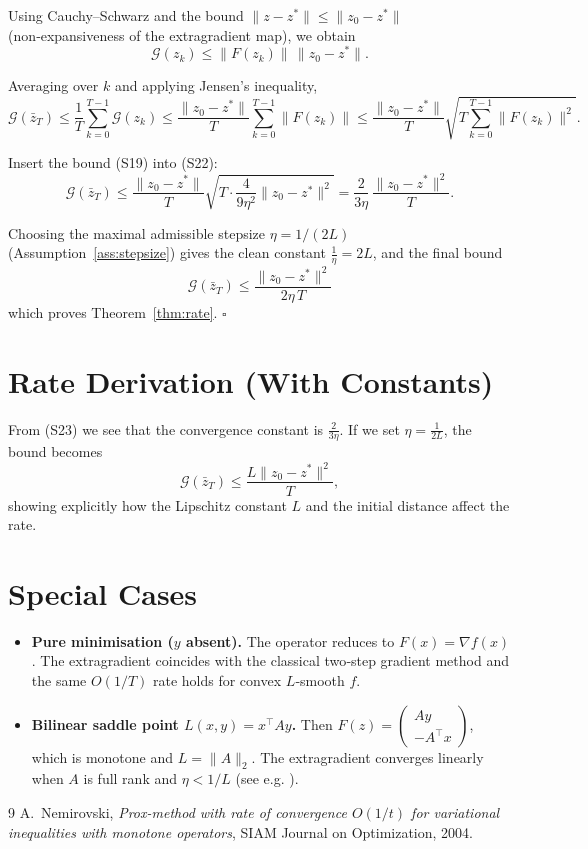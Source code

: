 \documentclass{article}
\begin{document}
Using Cauchy–Schwarz and the bound $\|z-z^{*}\|\le\|z_{0}-z^{*}\|$ (non‑expansiveness of the extragradient map), we obtain
\[
\mathcal G(z_{k})\le \|F(z_{k})\|\,\|z_{0}-z^{*}\|.
\tag{S21}
\]

Averaging over $k$ and applying Jensen’s inequality,
\[
\mathcal G(\bar z_{T})
\le \frac{1}{T}\sum_{k=0}^{T-1}\mathcal G(z_{k})
\le \frac{\|z_{0}-z^{*}\|}{T}\sum_{k=0}^{T-1}\|F(z_{k})\|
\le \frac{\|z_{0}-z^{*}\|}{T}\sqrt{T\sum_{k=0}^{T-1}\|F(z_{k})\|^{2}} .
\tag{S22}
\]

Insert the bound (S19) into (S22):
\[
\mathcal G(\bar z_{T})
\le \frac{\|z_{0}-z^{*}\|}{T}\sqrt{T\cdot\frac{4}{9\eta^{2}}\|z_{0}-z^{*}\|^{2}}
= \frac{2}{3\eta}\,\frac{\|z_{0}-z^{*}\|^{2}}{T}.
\tag{S23}
\]

Choosing the maximal admissible stepsize $\eta=1/(2L)$ (Assumption~\ref{ass:stepsize}) gives the clean constant $\frac{1}{\eta}=2L$, and the final bound
\[
\boxed{\;
\mathcal G(\bar z_{T})\le \frac{\|z_{0}-z^{*}\|^{2}}{2\eta\,T}
\;}
\]
which proves Theorem~\ref{thm:rate}. \hfill $\square$

\section*{Rate Derivation (With Constants)}
From (S23) we see that the convergence constant is $\frac{2}{3\eta}$.  
If we set $\eta=\frac{1}{2L}$, the bound becomes
\[
\mathcal G(\bar z_{T})\le \frac{L\|z_{0}-z^{*}\|^{2}}{T},
\]
showing explicitly how the Lipschitz constant $L$ and the initial distance affect the rate.

\section*{Special Cases}
\begin{itemize}
\item \textbf{Pure minimisation ($y$ absent).} The operator reduces to $F(x)=\nabla f(x)$. The extragradient coincides with the classical two‑step gradient method and the same $O(1/T)$ rate holds for convex $L$‑smooth $f$.
\item \textbf{Bilinear saddle point $L(x,y)=x^{\top}Ay$.} Then $F(z)=\begin{pmatrix}Ay\\-A^{\top}x\end{pmatrix}$, which is monotone and $L=\|A\|_{2}$. The extragradient converges linearly when $A$ is full rank and $\eta<1/L$ (see e.g. \cite{nemirovski2004prox}).
\end{itemize}

\begin{thebibliography}{9}
A.~Nemirovski, \emph{Prox-method with rate of convergence $O(1/t)$ for variational inequalities with monotone operators}, SIAM Journal on Optimization, 2004.
\end{thebibliography}
\end{document}
